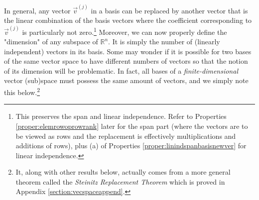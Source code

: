 In general, any vector $\vec{v}^{(j)}$ in a basis can be replaced by another vector that is the linear combination of the basis vectors where the coefficient corresponding to $\vec{v}^{(j)}$ is particularly not zero.\footnote{\label{foot:ft14}This preserves the span and linear independence. Refer to Properties \ref{proper:elemrowoprowrank} later for the span part (where the vectors are to be viewed as rows and the replacement is effectively multiplications and additions of rows), plus (a) of Properties \ref{proper:linindspanbasisnewver} for linear independence.} Moreover, we can now properly define the "dimension" of any subspace of $\mathbb{R}^n$. It is simply the number of (linearly independent) vectors in its basis. Some may wonder if it is possible for two bases of the same vector space to have different numbers of vectors so that the notion of its dimension will be problematic. In fact, all bases of a \textit{finite-dimensional} vector (sub)space must possess the same amount of vectors, and we simply note this below.\footnote{It, along with other results below, actually comes from a more general theorem called the \textit{Steinitz Replacement Theorem} which is proved in Appendix \ref{section:vecspaceappend}.} %

